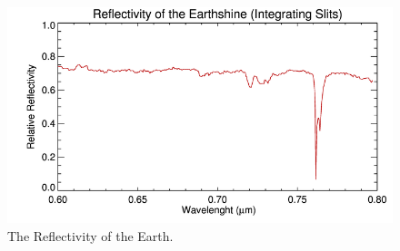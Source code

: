 \begin{figure}[htb]
\begin{center}
\includegraphics[scale=0.6]{plots/reflectivity2.png}
\caption{The Reflectivity of the Earth.}
\label{fig-es}
\end{center}
\end{figure}





